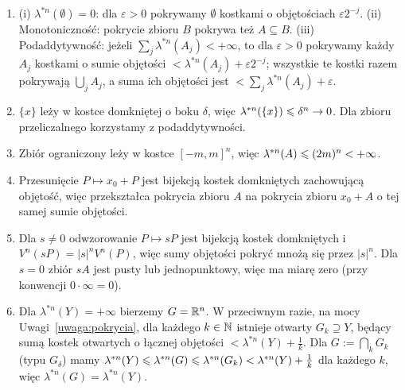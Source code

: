 \begin{dow}
    \begin{enumerate}
        \item (i) $\lambda^{*n}(\emptyset) = 0$: dla $\varepsilon > 0$ pokrywamy $\emptyset$ kostkami o objętościach $\varepsilon 2^{-j}$. (ii) Monotoniczność: pokrycie zbioru $B$ pokrywa też $A \subseteq B$. (iii) Podaddytywność: jeżeli $\sum_j \lambda^{*n}(A_j) < +\infty$, to dla $\varepsilon > 0$ pokrywamy każdy $A_j$ kostkami o sumie objętości $< \lambda^{*n}(A_j) + \varepsilon 2^{-j}$; wszystkie te kostki razem pokrywają $\bigcup_j A_j$, a suma ich objętości jest $< \sum_j \lambda^{*n}(A_j) + \varepsilon$.
        \item $\{x\}$ leży w kostce domkniętej o boku $\delta$, więc $\lambda^{*n}(\{x\}) \leqslant \delta^n \to 0$. Dla zbioru przeliczalnego korzystamy z podaddytywności.
        \item Zbiór ograniczony leży w kostce $[-m, m]^n$, więc $\lambda^{*n}(A) \leqslant (2m)^n < +\infty$.
        \item Przesunięcie $P \mapsto x_0 + P$ jest bijekcją kostek domkniętych zachowującą objętość, więc przekształca pokrycia zbioru $A$ na pokrycia zbioru $x_0 + A$ o tej samej sumie objętości.
        \item Dla $s \neq 0$ odwzorowanie $P \mapsto sP$ jest bijekcją kostek domkniętych i $V^n(sP) = |s|^n V^n(P)$, więc sumy objętości pokryć mnożą się przez $|s|^n$. Dla $s = 0$ zbiór $sA$ jest pusty lub jednopunktowy, więc ma miarę zero (przy konwencji $0 \cdot \infty = 0$).
        \item Dla $\lambda^{*n}(Y) = +\infty$ bierzemy $G = \mathbb{R}^{n}$. W przeciwnym razie, na mocy Uwagi~\ref{uwaga:pokrycia}, dla każdego $k \in \mathbb{N}$ istnieje otwarty $G_k \supseteq Y$, będący sumą kostek otwartych o łącznej objętości $< \lambda^{*n}(Y) + \frac{1}{k}$. Dla $G := \bigcap_k G_k$ (typu $G_\delta$) mamy $\lambda^{*n}(Y) \leqslant \lambda^{*n}(G) \leqslant \lambda^{*n}(G_k) < \lambda^{*n}(Y) + \frac{1}{k}$ dla każdego $k$, więc $\lambda^{*n}(G) = \lambda^{*n}(Y)$.
    \end{enumerate}
\end{dow}
